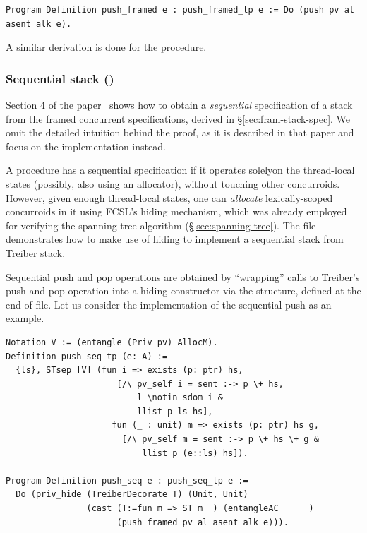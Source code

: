 \begin{lstlisting}
Program Definition push_framed e : push_framed_tp e := Do (push pv al asent alk e).  
\end{lstlisting}

A similar derivation is done for the  procedure.

\subsubsection{Sequential stack ()}
\label{sec:sequential-stack}

Section 4 of the paper~\cite{Sergey-al:ESOP15} shows how to obtain a
\emph{sequential} specification of a stack from the framed concurrent
specifications, derived in \S\ref{sec:fram-stack-spec}. We omit the
detailed intuition behind the proof, as it is described in that paper
and focus on the implementation instead.

A procedure has a sequential specification if it operates solelyon the
thread-local states (possibly, also using an allocator), without
touching other concurroids. However, given enough thread-local states,
one can \emph{allocate} lexically-scoped concurroids in it using
FCSL's hiding mechanism, which was already employed for verifying the
spanning tree algorithm (\S\ref{sec:spanning-tree}). The file
 demonstrates how to make use of hiding to implement
a sequential stack from Treiber stack.

Sequential push and pop operations are obtained by ``wrapping'' calls
to Treiber's push and pop operation into a hiding constructor via the
 structure, defined at the end of
 file. Let us consider the implementation of the
sequential push as an example.

\begin{lstlisting}
Notation V := (entangle (Priv pv) AllocM). 
Definition push_seq_tp (e: A) :=
  {ls}, STsep [V] (fun i => exists (p: ptr) hs, 
                      [/\ pv_self i = sent :-> p \+ hs,
                          l \notin sdom i & 
                          llist p ls hs],
                     fun (_ : unit) m => exists (p: ptr) hs g, 
                       [/\ pv_self m = sent :-> p \+ hs \+ g & 
                           llist p (e::ls) hs]). 

Program Definition push_seq e : push_seq_tp e :=
  Do (priv_hide (TreiberDecorate T) (Unit, Unit) 
                (cast (T:=fun m => ST m _) (entangleAC _ _ _) 
                      (push_framed pv al asent alk e))).  
\end{lstlisting}

